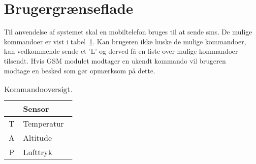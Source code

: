 \section{Brugergrænseflade}

Til anvendelse af systemet skal en mobiltelefon bruges til at sende sms. De mulige kommandoer er vist i tabel~\ref{tab:commands}. Kan brugeren ikke huske de mulige kommandoer, kan vedkommende sende et 'L' og derved få en liste over mulige kommandoer tilsendt. Hvis GSM modulet modtager en ukendt kommando vil brugeren modtage en besked som gør opmærksom på dette.

\begin{table}[h]
	\centering
	\begin{tabular}{|c|l|}
		\hline
		\rowcolor[HTML]{EFEFEF} 
		\multicolumn{1}{|l|}{\cellcolor[HTML]{EFEFEF}\textbf{SMS}} & \textbf{Sensor}	\\ \hline
		T & Temperatur	\\ \hline
		A & Altitude	\\ \hline
		P & Lufttryk	\\ \hline
	\end{tabular}
	\caption{Kommandooversigt.}
	\label{tab:commands}
\end{table}
